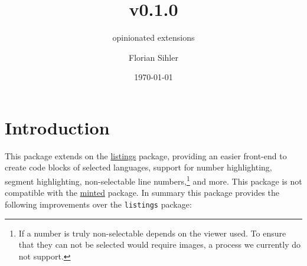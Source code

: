 \documentclass[10pt,DIV=12]{scrartcl}
\title{\T{xlistings} v0.1.0}
\subtitle{opinionated \T{listings} extensions}
\date{\today}
\author{Florian Sihler}
\let\T\texttt
\begin{document}
    \maketitle

\section{Introduction}

This package extends on the \href{https://ctan.org/pkg/listings}{listings} package, providing an easier front-end to create code blocks of selected languages, support for number highlighting, segment highlighting, non-selectable line numbers,\footnote{If a number is truly non-selectable depends on the viewer used. To ensure that they can not be selected would require images, a process we currently do not support.} and more.
This package is not compatible with the \href{https://ctan.org/pkg/minted}{minted} package.
In summary this package provides the following improvements over the \T{listings} package:
\end{document}
